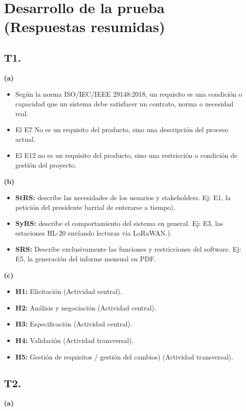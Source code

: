 \documentclass[11pt]{article}
\newcommand{\seccion}[1]{\section{\textcolor{utegreendk}{#1}}}
\newcommand{\subseccion}[1]{\subsection{\textcolor{midblue}{#1}}}
\begin{document}
	\seccion{Desarrollo de la prueba (Respuestas resumidas)}
	
	\subseccion{T1. }
	
	\textbf{(a)}

	\begin{itemize}[leftmargin=18pt,itemsep=2pt]
		\item Según la norma ISO/IEC/IEEE 29148:2018, un requisito es una condición o capacidad que un sistema debe satisfacer un contrato, norma o necesidad real.
		\item El E7 No es un requisito del producto, sino una descripción del proceso actual.
		\item El E12 no es un requisito del producto, sino una restricción  o condición de gestión del proyecto.
	\end{itemize}
	
	\textbf{(b)}
	\begin{itemize}[leftmargin=18pt,itemsep=2pt]
		\item \textbf{StRS:} describe las necesidades de los usuarios y stakeholders. Ej: E1, la petición del presidente barrial de enterarse a tiempo).
		\item \textbf{SyRS:} describe el comportamiento del sistema en general. Ej: E3, las estaciones HL-20 envíando lecturas via LoRaWAN.).
		\item \textbf{SRS:} Describe exclusivamente las funciones y restricciones del software. Ej: E5, la generación del informe mensual en PDF.
	\end{itemize}
	
	\textbf{(c)}
	\begin{itemize}[leftmargin=18pt,itemsep=2pt]
		\item \textbf{H1:} Elicitación (Actividad central).
		\item \textbf{H2:} Análisis y negociación (Actividad central).
		\item \textbf{H3:} Especificación (Actividad central).
		\item \textbf{H4:} Validación (Actividad transversal).
		\item \textbf{H5:} Gestión de requisitos / gestión del cambios) (Actividad transversal).
	\end{itemize}
	
	\subseccion{T2.}
	
	\textbf{(a) }
	
\end{document}
